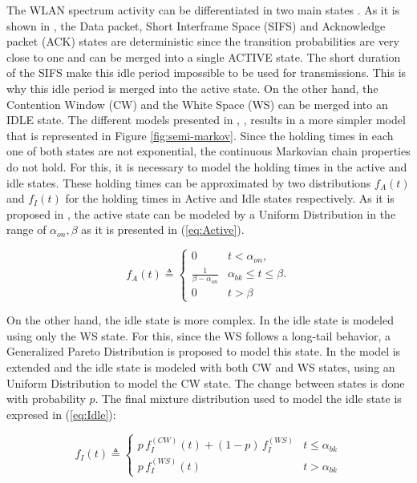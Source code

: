 The \acs{WLAN} spectrum activity can be differentiated in two main states \cite{DSA-Emp}. As it is shown in \cite{ActiveMeasure}, the Data packet, Short Interframe Space (\acs{SIFS}) and Acknowledge packet (\acs{ACK}) states are deterministic since the transition probabilities are very close to one and can be merged into a single ACTIVE state. The short duration of the \acs{SIFS} make this idle period impossible to be used for transmissions. This is why this idle period is merged into the active state. On the other hand, the Contention Window (\acs{CW}) and the White Space (\acs{WS}) can be merged into an IDLE state. The different models presented in \cite{DSA-Emp}, \cite{ioannis}, \cite{marcello} results in a more simpler model that is represented in Figure \ref{fig:semi-markov}. Since the holding times in each one of both states are not exponential, the continuous Markovian chain properties do not hold. For this, it is necessary to model the holding times in the active and idle states. These holding times can be approximated by two distributions ${f_A(t)}$ and ${f_I(t)}$ for the holding times in Active and Idle states respectively. As it is proposed in \cite{DSA-Emp}, the active state can be modeled by a Uniform Distribution in the range of ${\alpha_{on}, \beta}$ as it is presented in (\ref{eq:Active}). 

\begin{equation}
	\label{eq:Active}
	f_A(t) \triangleq
	\begin{cases}
		0 & t < \alpha_{on}, \\
		\frac{1}{\beta - \alpha_{on}} & \alpha_{bk} \leq  t \leq  \beta. \\
		0 & t > \beta
	\end{cases}
\end{equation}

On the other hand, the idle state is more complex. In \cite{ActiveMeasure} the idle state is modeled using only the \acs{WS} state. For this, since the \acs{WS} follows a long-tail behavior, a Generalized Pareto Distribution is proposed to model this state. In \cite{DSA-Emp} the model is extended and the idle state is modeled with both \acs{CW} and \acs{WS} states, using an Uniform Distribution to model the \acs{CW} state. The change between states is done with probability ${p}$. The final mixture distribution used to model the idle state is expresed in (\ref{eq:Idle}):

\begin{equation}
	\label{eq:Idle}
	f_I(t) \triangleq
	\begin{cases}
		p \, f^{(CW)}_I(t) + (1 - p) \, f^{(WS)}_I & t \le \alpha_{bk} \\
		p \, f^{(WS)}_I(t) & t > \alpha_{bk}
	\end{cases}
\end{equation}

